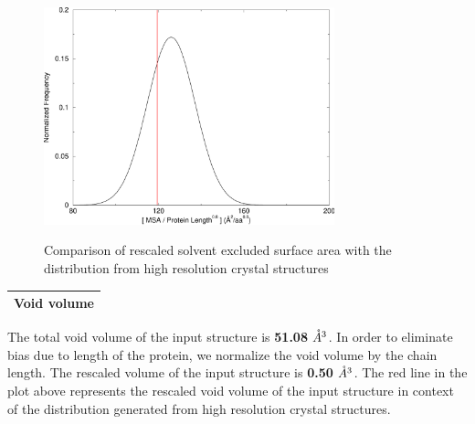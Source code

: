 \documentclass[11pt,twoside,letterpaper]{article}
\begin{document}
\begin{figure}[h!]
	\begin{center}
		\includegraphics[width=0.75\textwidth]{4ins-678-msa.pdf}\\
		\caption{Comparison of rescaled solvent excluded surface area with the distribution from high resolution crystal structures}
	\end{center}
\end{figure}

\newpage
\begin{table}[!h]
	\begin{center}
		\begin{tabular}{p{16.1cm}}
			\midrule
			\cellcolor[gray]{0.9}\textbf{Void volume}\\
			\midrule
		\end{tabular}
	\end{center}
\end{table}

The total void volume of the input structure is \textbf{51.08} ${\mathring{A}\textsuperscript{3}}$. In order to eliminate bias due to length of the protein, we normalize the void volume by the chain length. The rescaled volume of the input structure is \textbf{0.50} ${\mathring{A}\textsuperscript{3}}$. The red line in the plot above represents the rescaled void volume of the input structure in context of the distribution generated from high resolution crystal structures.
\end{document}
